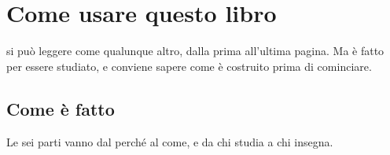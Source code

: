 %
\chapter{Come usare questo libro}

 si può leggere come qualunque altro, dalla
prima all'ultima pagina. Ma è fatto per essere studiato, e conviene
sapere come è costruito prima di cominciare.

\section*{Come è fatto}

Le sei parti vanno dal perché al come, e da chi studia a chi insegna.

